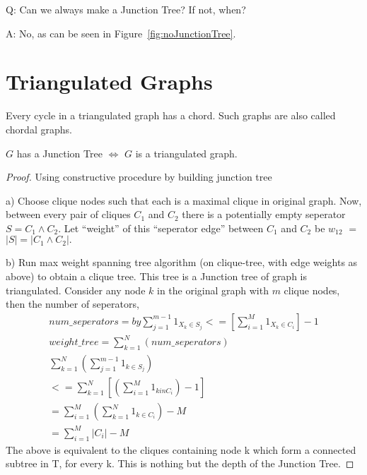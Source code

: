 \documentclass[12pt]{report}
\begin{document}
Q: Can we always make a Junction Tree? If not, when?

A: No, as can be seen in Figure~\ref{fig:noJunctionTree}.

\section{Triangulated Graphs}
Every cycle in a triangulated graph has a chord. Such graphs are also called chordal graphs.

\begin{theorem}
$G$ has a Junction Tree $\Leftrightarrow$ $G$ is a triangulated graph.
\end{theorem}

\begin{proof}
Using constructive procedure by building junction tree

a) Choose clique nodes such that each is a maximal clique in original graph. Now, between every pair of cliques $C_{1}$ and $C_{2}$ there is a potentially empty seperator $S = C_{1} \land C_{2}$. Let ``weight'' of this ``seperator edge'' between $C_{1}$ and $C_{2}$ be $w_{12}$ $=$ $|S| = |C_{1} \land C_{2}|.$

b) Run max weight spanning tree algorithm (on clique-tree, with edge weights as above) to obtain a clique tree. This tree is a Junction tree of graph is triangulated. Consider any node $k$ in the original graph with $m$ clique nodes, then the number of seperators,
\begin{eqnarray*}
num\_seperators = by \sum _{j = 1} ^{m - 1} 1 _{X_{k} \in S_{j}} <= [\sum _{i = 1} ^{M} 1_{X_{k} \in C_{i}}] - 1 \\
weight\_tree = \sum _{k = 1} ^{N} (num\_seperators)\\
\sum _{k = 1} ^{N} (\sum _{j = 1} ^{m - 1} 1 _{k \in S_{j}})\\
<= \sum _{k = 1} ^{N} [(\sum _{i = 1} ^{M} 1_{k in C_{i}}) - 1]\\
= \sum _{i = 1} ^{M} (\sum _{k = 1} ^{N} 1 _{k \in C_{i}}) - M\\
= \sum _{i = 1} ^{M} |C_{i}| - M
\end{eqnarray*}
The above is equivalent to the cliques containing node k which form a connected subtree in T, for every k. This is nothing but the depth of the Junction Tree.
\end{proof}
\end{document}
